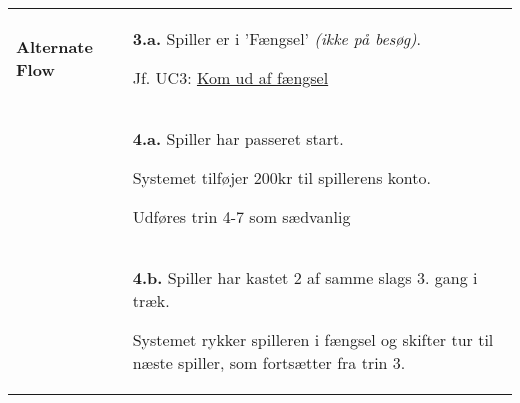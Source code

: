 \documentclass[class=article, crop=false]{standalone}
\begin{document}
\begin{table}[H]
\begin{tabularx}{\textwidth}{|l|X|}
    \textbf{Alternate Flow}   & \textbf{3.a.} Spiller er i 'Fængsel' \textit{(ikke på besøg)}.
    \begin{enumerate} \begin{tabenum}
                          \item Jf. UC3: \underline{Kom ud af fængsel}
    \end{tabenum} \end{enumerate}
    \\



                              & \textbf{4.a.} Spiller har passeret start.
                                \begin{enumerate} \begin{tabenum}
                                        \item Systemet tilføjer 200kr til spillerens konto.
                                        \item Udføres trin 4-7 som sædvanlig
                                    \end{tabenum} \end{enumerate}
                                 \\


                            & \textbf{4.b.} Spiller har kastet 2 af samme slags 3. gang i træk.
                            \begin{enumerate} \begin{tabenum}

                                                  \item Systemet rykker spilleren i fængsel og skifter tur til næste spiller, som fortsætter fra trin 3.
                            \end{tabenum} \end{enumerate}
                            \\





\end{tabularx}
\end{table}
\end{document}
